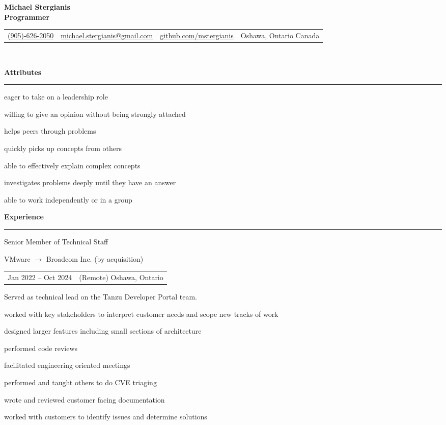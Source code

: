 \documentclass[letterpaper]{article}
\makeatletter
\newcommand{\primary}{\color{primary}}
\newcommand{\primarydark}{\color{primarydark}}
\newcommand{\complementary}{\color{complementary}}
\newcommand{\mapMarker}{\faMapMarker*[alt]}
\newcommand{\email}
{\faEnvelope \space \href{mailto:michaelstergianis@gmail.com}{michael.stergianis@gmail.com}}
\newcommand{\github}
{\faGithub \space \href{https://github.com/mstergianis}{github.com/mstergianis}}
\newcommand{\phone}
{\faPhone \space \href{tel:+1-905-626-2050}{(905)-626-2050}}
\newcommand{\location}
{\mapMarker \space Oshawa, Ontario Canada}
\newenvironment{heading}[1]{%
  {\LARGE \primarydark \textbf{#1}}\\ {\complementary
    \rule[5pt]{\linewidth}{0.6pt}}
}
{\par\vspace{8pt}}
\newenvironment{experience}[4]{
  { #1 \par}
  {\small \primary #2 \par}
  \begin{tabularx}{\linewidth}{ l l }
    { \small \faCalendar \space #3 } & { \small \mapMarker \space #4 }
  \end{tabularx}%
}{
  \vspace{8pt}
}
\newenvironment{itemize*}%
{\begin{itemize}[topsep=0pt,leftmargin=20pt]%
    \setlength{\itemsep}{0pt}%
    \setlength{\parsep}{0pt}%
    \setlength{\parskip}{0pt}%
    \small%
  }%
  {\end{itemize}}
\makeatother
\begin{document}
{\huge \textbf{Michael Stergianis}}\\
{\large \primary \textbf{Programmer}}
\\

\begin{tabularx}{\linewidth}{ l l l l }
  \phone & \email & \github & \location \\
\end{tabularx}\\

\begin{minipage}[t]{0.58\textwidth}%
  \begin{heading}{Attributes}
    \begin{itemize*}
    \item eager to take on a leadership role
    \item willing to give an opinion without being strongly attached
    \item helps peers through problems
    \item quickly picks up concepts from others
    \item able to effectively explain complex concepts
    \item investigates problems deeply until they have an answer
    \item able to work independently or in a group
    \end{itemize*}
  \end{heading}
  \begin{heading}{Experience}%
    \begin{experience}{Senior Member of Technical Staff}
      {VMware \(\rightarrow\) Broadcom Inc. (by acquisition)}
      {Jan 2022 -- Oct 2024}
      {(Remote) Oshawa, Ontario}
      Served as technical lead on the Tanzu Developer Portal team.
      \begin{itemize*}
      \item worked with key stakeholders to interpret customer needs and scope
        new tracks of work
      \item designed larger features including small sections of architecture
      \item performed code reviews
      \item facilitated engineering oriented meetings
      \item performed and taught others to do CVE triaging
      \item wrote and reviewed customer facing documentation
      \item worked with customers to identify issues and determine solutions

\end{itemize*}
\end{experience}
\end{heading}
\end{minipage}
\end{document}
